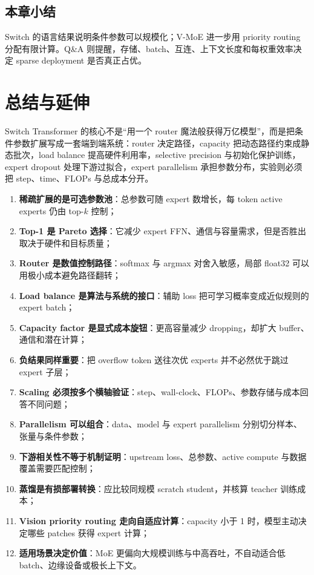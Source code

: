 \documentclass[a4paper]{article}
\begin{document}

\subsection{本章小结}

Switch 的语言结果说明条件参数可以规模化；V-MoE 进一步用 priority routing 分配有限计算。Q\&A 则提醒，存储、batch、互连、上下文长度和每权重效率决定 sparse deployment 是否真正占优。

\section{总结与延伸}

Switch Transformer 的核心不是“用一个 router 魔法般获得万亿模型”，而是把条件参数扩展写成一套端到端系统：router 决定路径，capacity 把动态路径约束成静态批次，load balance 提高硬件利用率，selective precision 与初始化保护训练，expert dropout 处理下游过拟合，expert parallelism 承担参数分布，实验则必须把 step、time、FLOPs 与总成本分开。

\begin{enumerate}
  \item \textbf{稀疏扩展的是可选参数池}：总参数可随 expert 数增长，每 token active experts 仍由 top-$k$ 控制；
  \item \textbf{Top-1 是 Pareto 选择}：它减少 expert FFN、通信与容量需求，但是否胜出取决于硬件和目标质量；
  \item \textbf{Router 是数值控制路径}：softmax 与 argmax 对舍入敏感，局部 float32 可以用极小成本避免路径翻转；
  \item \textbf{Load balance 是算法与系统的接口}：辅助 loss 把可学习概率变成近似规则的 expert batch；
  \item \textbf{Capacity factor 是显式成本旋钮}：更高容量减少 dropping，却扩大 buffer、通信和潜在计算；
  \item \textbf{负结果同样重要}：把 overflow token 送往次优 experts 并不必然优于跳过 expert 子层；
  \item \textbf{Scaling 必须按多个横轴验证}：step、wall-clock、FLOPs、参数存储与成本回答不同问题；
  \item \textbf{Parallelism 可以组合}：data、model 与 expert parallelism 分别切分样本、张量与条件参数；
  \item \textbf{下游相关性不等于机制证明}：upstream loss、总参数、active compute 与数据覆盖需要匹配控制；
  \item \textbf{蒸馏是有损部署转换}：应比较同规模 scratch student，并核算 teacher 训练成本；
  \item \textbf{Vision priority routing 走向自适应计算}：capacity 小于 1 时，模型主动决定哪些 patches 获得 expert 计算；
  \item \textbf{适用场景决定价值}：MoE 更偏向大规模训练与中高吞吐，不自动适合低 batch、边缘设备或极长上下文。
\end{enumerate}
\end{document}
